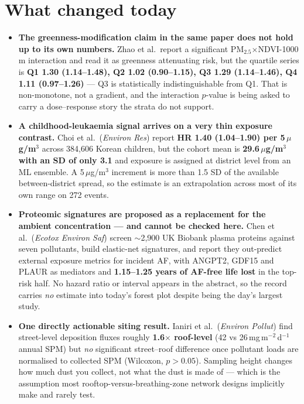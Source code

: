 \documentclass[10pt]{article}
\begin{document}
\vspace{3mm}

\section*{\sffamily\bfseries\color{Deep}What changed today}
\vspace{-1.5mm}{\color{Amber}\rule{\linewidth}{1.1pt}}\vspace{2.5mm}

\footnotesize
\begin{itemize}
\item \textbf{The greenness-modification claim in the same paper does not hold up to its
own numbers.} Zhao et al.\ report a significant PM$_{2.5}$$\times$NDVI-1000\,m interaction
and read it as greenness attenuating risk, but the quartile series is
\textbf{Q1 1.30 (1.14--1.48), Q2 1.02 (0.90--1.15), Q3 1.29 (1.14--1.46),
Q4 1.11 (0.97--1.26)} --- Q3 is statistically indistinguishable from Q1. That is
non-monotone, not a gradient, and the interaction $p$-value is being asked to carry a
dose--response story the strata do not support.

\item \textbf{A childhood-leukaemia signal arrives on a very thin exposure contrast.}
Choi et al.\ (\textit{Environ Res}) report \textbf{HR 1.40 (1.04--1.90) per 5\,$\mu$g/m$^3$}
across 384{,}606 Korean children, but the cohort mean is
\textbf{29.6\,$\mu$g/m$^3$ with an SD of only 3.1} and exposure is assigned at
district level from an ML ensemble. A 5\,$\mu$g/m$^3$ increment is more than 1.5 SD of the
available between-district spread, so the estimate is an extrapolation across most of its
own range on 272 events.

\item \textbf{Proteomic signatures are proposed as a replacement for the ambient
concentration --- and cannot be checked here.} Chen et al.\ (\textit{Ecotox Environ Saf})
screen $\sim$2{,}900 UK Biobank plasma proteins against seven pollutants, build elastic-net
signatures, and report they out-predict external exposure metrics for incident AF, with
ANGPT2, GDF15 and PLAUR as mediators and \textbf{1.15--1.25 years of AF-free life lost} in
the top-risk half. No hazard ratio or interval appears in the abstract, so the record
carries \emph{no} estimate into today's forest plot despite being the day's largest study.

\item \textbf{One directly actionable siting result.} Ianiri et al.\
(\textit{Environ Pollut}) find street-level deposition fluxes roughly \textbf{1.6$\times$
roof-level} (42 vs 26\,mg\,m$^{-2}$\,d$^{-1}$ annual SPM) but \emph{no} significant
street--roof difference once pollutant loads are normalised to collected SPM
(Wilcoxon, $p>0.05$). Sampling height changes how much dust you collect, not what the dust
is made of --- which is the assumption most rooftop-versus-breathing-zone network designs
implicitly make and rarely test.


\end{itemize}
\end{document}
